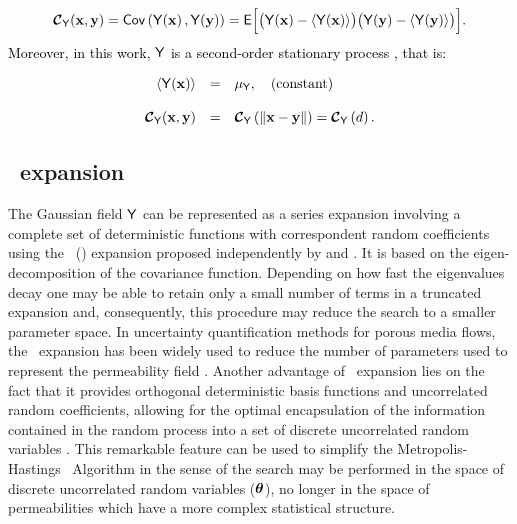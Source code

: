 \begin{equation}
 {\boldmath{\mbox{$\mathcal{C}$}}}_{\mathsf{Y}}(\mathbf{x}, \mathbf{y}) = \mathsf{Cov}\left( \mathsf{Y}\!\left(\mathbf{x}\right), \mathsf{Y}\!\left(\mathbf{y}\right) \right) = \mathsf{E}\Big[ \big( \mathsf{Y}\!\left(\mathbf{x}\right) - \langle {\mathsf{Y}\!\left(\mathbf{x}\right)} \rangle  \big) \big( \mathsf{Y}\!\left(\mathbf{y}\right) - \langle {\mathsf{Y}\!\left(\mathbf{y}\right)} \rangle  \big) \Big].
 \label{covg}
\end{equation}
%
\textcolor{black}{Moreover, in this work, $\mathsf{Y}$ is a second-order stationary process \citep{gelhar93}, that is:}

\begin{equation}
 \begin{array}{rcl}
    \langle {\mathsf{Y}\!\left(\mathbf{x}\right)} \rangle &=& {\mu_{\mathsf{Y}}},\quad \mbox{(constant)}\\ \\
    {\boldmath{\mbox{$\mathcal{C}$}}}_{\mathsf{Y}}(\mathbf{x}, \mathbf{y})   &=& {\boldmath{\mbox{$\mathcal{C}$}}}_{\mathsf{Y}}\left(\lVert \mathbf{x} - \mathbf{y} \rVert \right) = {\boldmath{\mbox{$\mathcal{C}$}}}_{\mathsf{Y}}\left(d\right).
 \end{array}
\end{equation}



\subsection{\KL\ expansion}

The Gaussian field $\mathsf{Y}$ can be represented as a series expansion involving a complete set of deterministic functions with correspondent random coefficients using the \KL\ (\kl) expansion proposed independently by \cite{karhunen46} and \cite{loeve55}.
It is based on the eigen-decomposition of the covariance function.
Depending on how fast the eigenvalues decay one may be able to  retain only a small number of terms in a truncated expansion and, consequently, this procedure may reduce the search to a smaller parameter space.
In uncertainty quantification methods for porous media flows, the \kl\ expansion has been widely used to reduce the number of parameters used to represent the permeability field \citep{efendiev05,efendiev2006,das10,mondal10,ginting11,ginting12}.
Another advantage of \kl\ expansion lies on the fact that it provides orthogonal deterministic basis functions and uncorrelated random coefficients, allowing for the optimal encapsulation of the information contained in the random process into a set of discrete uncorrelated random variables \citep{GhanemSpanos}.
This remarkable feature can be used to simplify the Metropolis-Hastings \mcmc\ Algorithm in the sense of the search may be performed in the space of discrete uncorrelated random variables ($\boldsymbol{\theta}$), no longer in the space of permeabilities which have a more complex statistical structure.
